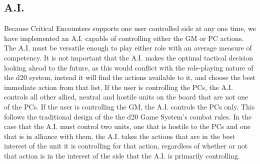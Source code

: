 \documentclass[letterpaper, 10 pt, conference]{ieeeconf}
\begin{document}
\subsection{A.I.}
Because Critical Encounters supports one user controlled side at any one time, we have implemented an A.I. capable of controlling either the GM or PC actions. The
A.I. must be versatile enough to play either role with an average measure of
competency. It is not important that the A.I. makes the optimal tactical decision
looking ahead to the future, as this would conflict with the role-playing nature of the d20 system, instead it will find the actions available to it, and choose the best immediate action from that list.
If the user is controlling the PCs, the A.I. controls all other allied, neutral
and hostile units on the board that are not one of the PCs. If the user is controlling
the GM, the A.I. controls the PCs only. This follows the traditional design of
the the d20 Game System’s combat rules. In the case that the A.I. must control
two units, one that is hostile to the PCs and one that is in alliance with them, the
A.I. takes the actions that are in the best interest of the unit it is controlling
for that action, regardless of whether or not that action is in the interest of the
side that the A.I. is primarily controlling.
\end{document}
